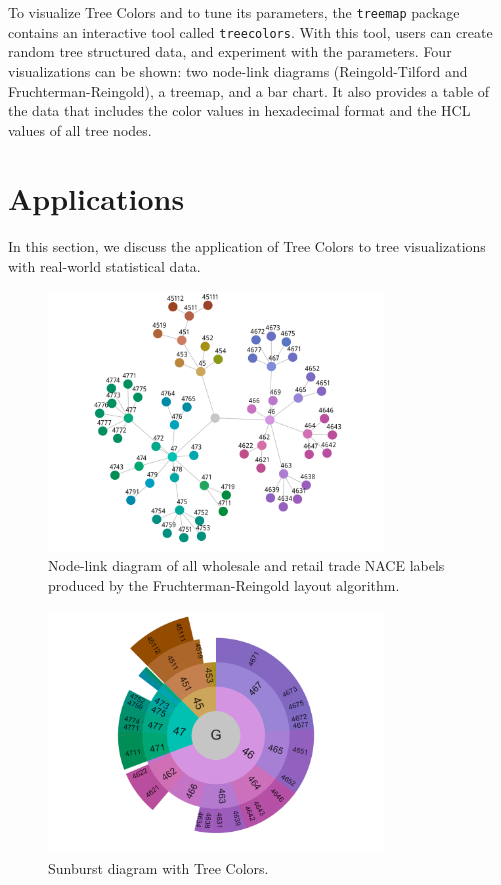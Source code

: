 \documentclass[journal]{vgtc}                %
\begin{document}
To visualize Tree Colors and to tune its parameters, the \texttt{treemap} package contains an interactive tool called \texttt{treecolors}. With this tool, users can create random tree structured data, and experiment with the parameters. Four visualizations can be shown: two node-link diagrams (Reingold-Tilford and Fruchterman-Reingold), a treemap, and a bar chart. It also provides a table of the data that includes the color values in hexadecimal format and the HCL values of all tree nodes.



\section{Applications}\label{secapplication}

In this section, we discuss the application of Tree Colors to tree visualizations with real-world statistical data.

\begin{figure}[!b]
  \centering
  \includegraphics[width=3.5in]{Gbusiness_FR.pdf}
  \caption{Node-link diagram of all wholesale and retail trade NACE labels produced by the Fruchterman-Reingold layout algorithm.}\label{fig:graphFRApp}
\end{figure}

\begin{figure}[!t]
  \centering
  \includegraphics[width=3.5in]{sunburst/sunburst.pdf}
  \caption{Sunburst diagram with Tree Colors.}\label{fig:sunburst}
  \vspace{-1ex}
\end{figure}
\end{document}
